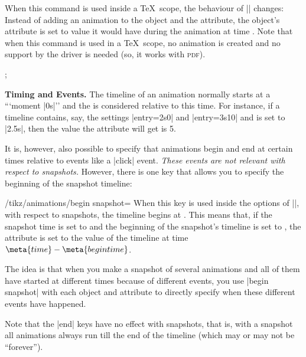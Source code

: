 \begin{command}{\pgfsnapshot{}}
  When this command is used inside a \TeX\ scope, the behaviour of
  |\pgfanimateattribute| changes: Instead of adding an animation to
  the object and the attribute, the object's attribute is set to value
  it would have during the animation at time .
  Note that when this command is used in a \TeX\ scope, no animation
  is created and no support by the driver is needed (so, 
  it works with \textsc{pdf}).

\begin{codeexample}[]
\tikz [make snapshot of=1s,
       animate me = {
         :rotate = { 0s = "0", 2s = "90" },
         :color  = { 0s = "red", 2s = "green" },
         :line width = { 0s = "0mm", 4s = "4mm" }
       }]
  ;
\end{codeexample}

  \medskip\textbf{Timing and Events.}
  The timeline of an animation normally starts at a ```moment |0s|''
  and the  is considered relative to this time. For
  instance, if a timeline contains, say, the settings |entry={2s}{0}|
  and |entry={3s}{10}| and  is set to |2.5s|, then the
  value the attribute will get is 5.

  It is, however, also possible to specify that animations begin and
  end at certain times relative to events like a |click|
  event. \emph{These events are not relevant with respect to
    snapshots.} However, there is one key that allows you to specify
  the beginning of the snapshot timeline:
  \begin{key}{/tikz/animations/begin snapshot=}
    When this key is used inside the options of
    |\pgfanimateattribute|, with respect to snapshots, the timeline
    begins at . This means that, if the snapshot time
    is set to  and the beginning of the snapshot's timeline
    is set to , the attribute is set to the value of
    the timeline at time $\meta{time} - \meta{begin time}$.

    The idea is that when you make a snapshot of several animations
    and all of them have started at different times because of
    different events, you use |begin snapshot| with each object and
    attribute to directly specify when these different events have
    happened. 
  \end{key}

  Note that the |end| keys have no effect with snapshots, that is,
  with a snapshot all animations always run till the end of the
  timeline (which may or may not be ``forever'').
  

\end{command}
